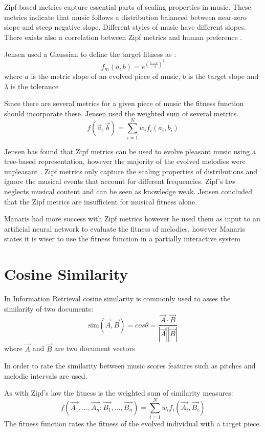 Zipf-based metrics capture essential parts of scaling properties in music. These metrics indicate that music follows a distribution balanced between near-zero slope and steep negative slope. Different styles of music have different slopes.
There exists also a correlation between Zipf metrics and human preference \cite{Manaris2005}.

Jensen used a Gaussian to define the target fitness as \cite{Dostal2013}:
\[f_m(a,b) = e^{(\frac{b-a}{-\lambda})^2} \]
where $a$ is the metric slope of an evolved piece of music, $b$ is the target slope and $\lambda$ is the tolerance

Since there are several metrics for a given piece of music the fitness function should incorporate these.
Jensen used the weighted sum of several metrics.  
\[f(\vec{a}, \vec{b}) = \sum_{i=1}^{N} w_i f_i(a_i, b_i) \]

Jensen has found that Zipf metrics can be used to evolve pleasant music using a tree-based representation, however the majority of the evolved melodies were unpleasant \cite{Dostal2013}. Zipf metrics only capture the scaling properties of distributions and ignore the musical events that account for different frequencies. Zipf's law neglects musical content and can be seen as knowledge weak.
Jensen concluded that the Zipf metrics are insufficient for musical fitness alone.

Manaris had more success with Zipf metrics however he used them as input to an artificial neural network to evaluate the fitness of melodies, however Manaris states it is wiser to use the fitness function in a partially interactive system \cite{Manaris2005}


\section{Cosine Similarity}
In Information Retrieval cosine similarity is commonly used to asses the similarity of two documents:
\[\text{sim}(\vec{A}, \vec{B}) = cos\theta = \frac{\vec{A} \cdot \vec{B}}{|\vec{A}||\vec{B}|} \]
where $\vec{A}$ and $\vec{B}$ are two document vectors

In order to rate the similarity between music scores features such as pitches and melodic intervals are used.

As with Zipf's law the fitness is the weighted sum of similarity measures:
\begin{equation}f(\vec{A_1}, \ldots, \vec{A_n}; \vec{B_1}, \ldots, \vec{B_n}) = \sum^N_{i=1} w_i f_i (\vec{A_i}, \vec{B_i}) \label{eq:fitcosfit} \end{equation}
The fitness function rates the fitness of the evolved individual with a target piece.

